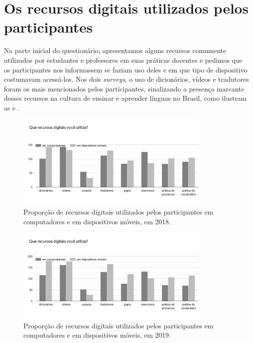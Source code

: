\documentclass[portuguese]{textolivre}
\begin{document}
\section{Os recursos digitais utilizados pelos participantes}\label{sec-fmt-manuscrito}
Na parte inicial do questionário, apresentamos alguns recursos comumente utilizados por estudantes e professores em suas práticas docentes e pedimos que os participantes nos informassem se faziam uso deles e em que tipo de dispositivo costumavam acessá-los. Nos dois \textit{surveys}, o uso de dicionários, vídeos e tradutores foram os mais mencionados pelos participantes, sinalizando a presença marcante desses recursos na cultura de ensinar e aprender línguas no Brasil, como ilustram as  e .

\begin{figure}[htbp]
 \centering
 \includegraphics[width=0.85\textwidth]{Figura7.png}
 \caption{Proporção de recursos digitais utilizados pelos participantes em computadores e em dispositivos móveis, em 2018.}
 \label{Fig7}
\end{figure}

\begin{figure}[htbp]
 \centering
 \includegraphics[width=0.85\textwidth]{Figura8.png}
 \caption{Proporção de recursos digitais utilizados pelos participantes em computadores e em dispositivos móveis, em 2019.}
 \label{Fig8}
\end{figure}
\end{document}

